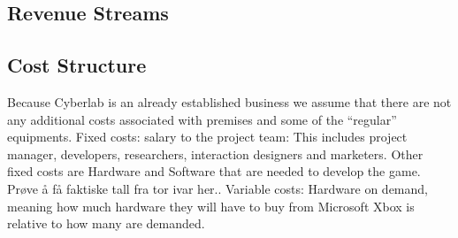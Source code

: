 \subsection{Revenue Streams}
\subsection{Cost Structure}
Because Cyberlab is an already established business we assume that there are not any additional costs associated with premises and some of the “regular” equipments.
Fixed costs: salary to the project team: This includes project manager, developers, researchers, interaction designers and marketers. Other fixed costs are Hardware and Software that are needed to develop the game. Prøve å få faktiske tall fra tor ivar her.. 
Variable costs: Hardware on demand, meaning how much hardware they will have to buy from Microsoft Xbox is relative to how many are demanded. 
